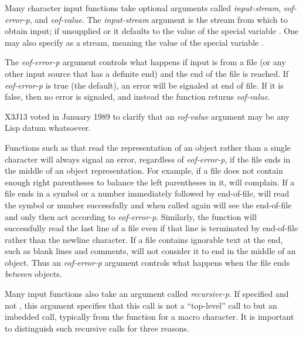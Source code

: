 Many character
input functions take optional arguments called {\it input-stream},
{\it eof-error-p}, and {\it eof-value}.  The {\it input-stream} argument is the
stream from
which to obtain input; if unsupplied or {\false} it defaults to the value of
the special variable .  One may also specify {\true}
as a stream, meaning the value of the special variable
.

The {\it eof-error-p} argument
controls what happens if input is from a file (or any other
input source that has a definite end) and the end of the file is reached.
If {\it eof-error-p} is true (the default), an error will be signaled
at end of file.  If it is false, then no error is signaled, and instead
the function returns {\it eof-value}.
\begin{new}
X3J13 voted in January 1989
to clarify that an {\it eof-value} argument
may be any Lisp datum whatsoever.
\end{new}


Functions such as  that read the representation
of an object rather than a single
character will always signal an error, regardless of {\it eof-error-p}, if
the file ends in the middle of an object representation.
For example, if a file does
not contain enough right parentheses to balance the left parentheses in
it,  will complain.  If a file ends in a symbol or a number
immediately followed by end-of-file,  will read the symbol or
number successfully and when called again will see the end-of-file and
only then act according to {\it eof-error-p}.
Similarly, the function 
will successfully read the last line of a file even if that line
is terminated by end-of-file rather than the newline character.
If a file contains ignorable text at the end, such
as blank lines and comments,  will not consider it to end in the
middle of an object.
Thus an {\it eof-error-p} argument controls what happens
when the file ends {\it between} objects.

Many input functions also take an argument called {\it recursive-p}.
If specified and not {\nil}, this argument specifies that
this call is not a ``top-level'' call to  but an imbedded call,
typically from the function for a macro character.
It is important to distinguish such recursive calls for three reasons.

